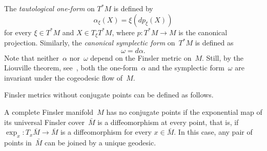 \documentclass[AHL,Unicode,longabstracts,published]{cedram}
\begin{document}
\begin{defi}
The \emph{tautological one-form} on $T^{*}M$ is defined by
\begin{equation}\label{eq:alpha}
\alpha_{\xi}(X)=\xi\left(dp_{\xi}(X)\right)
\end{equation}
for every $\xi\in T^{*}M$ and $X\in T_{\xi}T^{*}M$, where $p:T^*M \to M$ is the canonical projection. Similarly, the \emph{canonical symplectic form} on~$T^*M$ is defined as
\begin{equation}\label{eq:symplec}
\omega=d\alpha.
\end{equation}
Note that neither~$\alpha$ nor~$\omega$ depend on the Finsler metric on~$M$. Still, by the Liouville theorem, see~\cite[Remark~2.12]{Be78}, both the one-form~$\alpha$ and the symplectic form~$\omega$ are invariant under the cogeodesic flow of~$M$.
\end{defi}

Finsler metrics without conjugate points can be defined as follows.

\begin{defi}\label{def:ncp}
A complete Finsler manifold~$M$ has no conjugate points if the exponential map of its universal Finsler cover~$\bar{M}$ is a diffeomorphism at every point, that is, if $\exp_x:T_x \bar{M} \to \bar{M}$ is a diffeomorphism for every $x \in \bar{M}$. In this case, any pair of points in~$\bar{M}$ can be joined by a unique geodesic.
\end{defi}
\end{document}

